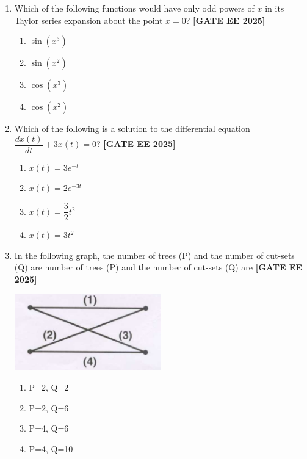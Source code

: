 \documentclass[12pt,a4paper]{article}
\begin{document}
\begin{enumerate}[leftmargin=2.5em, label=\textbf{Q.\arabic*}., itemsep=2em]
\item Which of the following functions would have only odd powers of $x$ in its Taylor series expansion about the point $x = 0$?
\newline
\noindent \textbf{[GATE EE 2025]}
    \begin{enumerate}[label=(\Alph*)]
        \item $\sin(x^3)$
        \item $\sin(x^2)$
        \item $\cos(x^3)$
        \item $\cos(x^2)$
    \end{enumerate}

\item Which of the following is a solution to the differential equation $\dfrac{dx(t)}{dt} + 3x(t) = 0$?
\newline
\noindent \textbf{[GATE EE 2025]}
    \begin{enumerate}[label=(\Alph*)]
        \item $x(t) = 3e^{-t}$
        \item $x(t) = 2e^{-3t}$
        \item $x(t) = \dfrac{3}{2} t^2$
        \item $x(t) = 3t^2$
    \end{enumerate}

\item In the following graph, the number of trees (P) and the number of cut-sets (Q) are
number of trees (P) and the number of cut-sets (Q) are
\newline
\noindent \textbf{[GATE EE 2025]}
\begin{center}
\includegraphics[width=0.5\textwidth]{figs/q7.png}
\end{center}
    \begin{enumerate}[label=(\Alph*)]
        \item P=2, Q=2
        \item P=2, Q=6
        \item P=4, Q=6
        \item P=4, Q=10
    \end{enumerate}


\end{enumerate}
\end{document}
